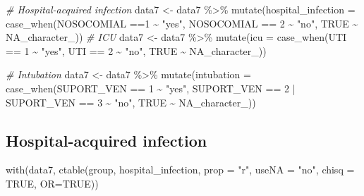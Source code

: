 \documentclass[
]{article}
\newenvironment{Shaded}{\begin{snugshade}}{\end{snugshade}}
\newcommand{\AttributeTok}[1]{\textcolor[rgb]{0.77,0.63,0.00}{#1}}
\newcommand{\CommentTok}[1]{\textcolor[rgb]{0.56,0.35,0.01}{\textit{#1}}}
\newcommand{\ConstantTok}[1]{\textcolor[rgb]{0.00,0.00,0.00}{#1}}
\newcommand{\DecValTok}[1]{\textcolor[rgb]{0.00,0.00,0.81}{#1}}
\newcommand{\FunctionTok}[1]{\textcolor[rgb]{0.00,0.00,0.00}{#1}}
\newcommand{\NormalTok}[1]{#1}
\newcommand{\OtherTok}[1]{\textcolor[rgb]{0.56,0.35,0.01}{#1}}
\newcommand{\SpecialCharTok}[1]{\textcolor[rgb]{0.00,0.00,0.00}{#1}}
\newcommand{\StringTok}[1]{\textcolor[rgb]{0.31,0.60,0.02}{#1}}
\begin{document}
\begin{Shaded}
\begin{Highlighting}[]
\CommentTok{\# Hospital{-}acquired infection}
\NormalTok{data7 }\OtherTok{\textless{}{-}}\NormalTok{  data7 }\SpecialCharTok{\%\textgreater{}\%}
  \FunctionTok{mutate}\NormalTok{(}\AttributeTok{hospital\_infection =} \FunctionTok{case\_when}\NormalTok{(NOSOCOMIAL }\SpecialCharTok{==}\DecValTok{1}  \SpecialCharTok{\textasciitilde{}} \StringTok{"yes"}\NormalTok{,}
\NormalTok{                             NOSOCOMIAL }\SpecialCharTok{==} \DecValTok{2} \SpecialCharTok{\textasciitilde{}} \StringTok{"no"}\NormalTok{,}
                               \ConstantTok{TRUE} \SpecialCharTok{\textasciitilde{}} \ConstantTok{NA\_character\_}\NormalTok{))}
\CommentTok{\# ICU}
\NormalTok{data7 }\OtherTok{\textless{}{-}}\NormalTok{ data7 }\SpecialCharTok{\%\textgreater{}\%}
  \FunctionTok{mutate}\NormalTok{(}\AttributeTok{icu =} \FunctionTok{case\_when}\NormalTok{(UTI }\SpecialCharTok{==} \DecValTok{1} \SpecialCharTok{\textasciitilde{}} \StringTok{"yes"}\NormalTok{,}
\NormalTok{                         UTI }\SpecialCharTok{==} \DecValTok{2} \SpecialCharTok{\textasciitilde{}} \StringTok{"no"}\NormalTok{,}
                         \ConstantTok{TRUE} \SpecialCharTok{\textasciitilde{}} \ConstantTok{NA\_character\_}\NormalTok{))}

\CommentTok{\# Intubation}
\NormalTok{data7 }\OtherTok{\textless{}{-}}\NormalTok{ data7 }\SpecialCharTok{\%\textgreater{}\%} 
  \FunctionTok{mutate}\NormalTok{(}\AttributeTok{intubation =} \FunctionTok{case\_when}\NormalTok{(SUPORT\_VEN }\SpecialCharTok{==} \DecValTok{1} \SpecialCharTok{\textasciitilde{}} \StringTok{"yes"}\NormalTok{,}
\NormalTok{                                SUPORT\_VEN }\SpecialCharTok{==} \DecValTok{2} \SpecialCharTok{|}\NormalTok{ SUPORT\_VEN }\SpecialCharTok{==} \DecValTok{3} \SpecialCharTok{\textasciitilde{}} \StringTok{"no"}\NormalTok{,}
                                \ConstantTok{TRUE} \SpecialCharTok{\textasciitilde{}} \ConstantTok{NA\_character\_}\NormalTok{))}
\end{Highlighting}
\end{Shaded}

\hypertarget{hospital-acquired-infection}{%
\subsection{Hospital-acquired
infection}\label{hospital-acquired-infection}}

\begin{Shaded}
\begin{Highlighting}[]
\FunctionTok{with}\NormalTok{(data7, }\FunctionTok{ctable}\NormalTok{(group, hospital\_infection, }\AttributeTok{prop =} \StringTok{"r"}\NormalTok{, }\AttributeTok{useNA =} \StringTok{"no"}\NormalTok{, }\AttributeTok{chisq =} \ConstantTok{TRUE}\NormalTok{, }\AttributeTok{OR=}\ConstantTok{TRUE}\NormalTok{))}
\end{Highlighting}
\end{Shaded}
\end{document}
